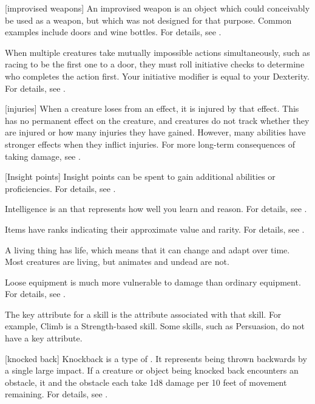 [improvised weapons] An improvised weapon is an object which could conceivably be used as a weapon, but which was not designed for that purpose.
Common examples include doors and wine bottles.
For details, see .

 When multiple creatures take mutually impossible actions simultaneously, such as racing to be the first one to a door, they must roll initiative checks to determine who completes the action first.
Your initiative modifier is equal to your Dexterity.
For details, see .

[injuries] When a creature loses  from an effect, it is injured by that effect.
This has no permanent effect on the creature, and creatures do not track whether they are injured or how many injuries they have gained.
However, many abilities have stronger effects when they inflict injuries.
For more long-term consequences of taking damage, see .

[Insight points] Insight points can be spent to gain additional abilities or proficiencies.
For details, see .

 Intelligence is an  that represents how well you learn and reason.
For details, see .

 Items have ranks indicating their approximate value and rarity.
For details, see .

 A living thing has life, which means that it can change and adapt over time.
Most creatures are living, but animates and undead are not.

 Loose equipment is much more vulnerable to damage than ordinary equipment.
For details, see .

 The key attribute for a skill is the attribute associated with that skill.
For example, Climb is a Strength-based skill.
Some skills, such as Persuasion, do not have a key attribute.

[knocked back] Knockback is a type of .
It represents being thrown backwards by a single large impact.
If a creature or object being knocked back encounters an obstacle, it and the obstacle each take 1d8 damage per 10 feet of movement remaining.
For details, see .

